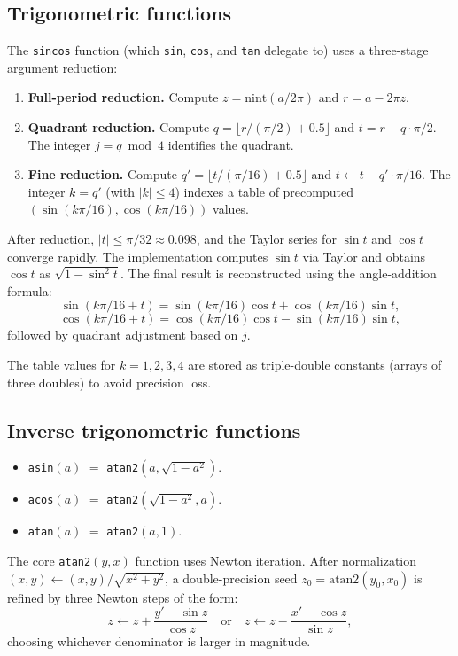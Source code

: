 \documentclass[11pt,a4paper]{article}
\begin{document}
\subsection{Trigonometric functions}

The \texttt{sincos} function (which \texttt{sin}, \texttt{cos},
and \texttt{tan} delegate to) uses a three-stage argument reduction:
\begin{enumerate}
\item \textbf{Full-period reduction.}  Compute
  $z = \mathrm{nint}(a / 2\pi)$ and $r = a - 2\pi z$.
\item \textbf{Quadrant reduction.}  Compute
  $q = \lfloor r / (\pi/2) + 0.5 \rfloor$ and
  $t = r - q \cdot \pi/2$.  The integer $j = q \bmod 4$
  identifies the quadrant.
\item \textbf{Fine reduction.}  Compute
  $q' = \lfloor t / (\pi/16) + 0.5 \rfloor$ and
  $t \gets t - q' \cdot \pi/16$.  The integer $k = q'$
  (with $|k| \le 4$) indexes a table of precomputed
  $(\sin(k\pi/16), \cos(k\pi/16))$ values.
\end{enumerate}

After reduction, $|t| \le \pi/32 \approx 0.098$, and the Taylor
series for $\sin t$ and $\cos t$ converge rapidly.  The
implementation computes $\sin t$ via Taylor and obtains $\cos t$
as $\sqrt{1 - \sin^2 t}$.  The final result is reconstructed using
the angle-addition formula:
\[
  \sin(k\pi/16 + t) = \sin(k\pi/16)\cos t + \cos(k\pi/16)\sin t,
\]
\[
  \cos(k\pi/16 + t) = \cos(k\pi/16)\cos t - \sin(k\pi/16)\sin t,
\]
followed by quadrant adjustment based on $j$.

The table values for $k = 1, 2, 3, 4$ are stored as
triple-double constants (arrays of three doubles) to avoid
precision loss.

\subsection{Inverse trigonometric functions}

\begin{itemize}
\item \texttt{asin}$(a)$ $=$ \texttt{atan2}$(a, \sqrt{1 - a^2})$.
\item \texttt{acos}$(a)$ $=$ \texttt{atan2}$(\sqrt{1 - a^2}, a)$.
\item \texttt{atan}$(a)$ $=$ \texttt{atan2}$(a, 1)$.
\end{itemize}

The core \texttt{atan2}$(y, x)$ function uses Newton iteration.
After normalization $(x, y) \gets (x, y) / \sqrt{x^2 + y^2}$,
a double-precision seed $z_0 = \text{atan2}(y_0, x_0)$ is refined
by three Newton steps of the form:
\[
  z \gets z + \frac{y' - \sin z}{\cos z}
  \quad \text{or} \quad
  z \gets z - \frac{x' - \cos z}{\sin z},
\]
choosing whichever denominator is larger in magnitude.
\end{document}
